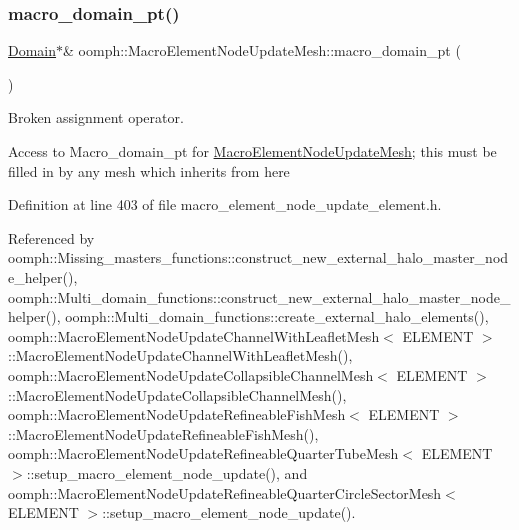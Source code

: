 \mbox{\label{classoomph_1_1MacroElementNodeUpdateMesh_af3b019d6a195493a7feb7f03832bb6fd}} 
\subsubsection{\texorpdfstring{macro\+\_\+domain\+\_\+pt()}{macro\_domain\_pt()}}
{\footnotesize\ttfamily \hyperlink{classoomph_1_1Domain}{Domain}$\ast$\& oomph\+::\+Macro\+Element\+Node\+Update\+Mesh\+::macro\+\_\+domain\+\_\+pt (\begin{DoxyParamCaption}{ }\end{DoxyParamCaption})\hspace{0.3cm}{\ttfamily [inline]}}



Broken assignment operator. 

Access to Macro\+\_\+domain\+\_\+pt for \hyperlink{classoomph_1_1MacroElementNodeUpdateMesh}{Macro\+Element\+Node\+Update\+Mesh}; this must be filled in by any mesh which inherits from here 

Definition at line 403 of file macro\+\_\+element\+\_\+node\+\_\+update\+\_\+element.\+h.



Referenced by oomph\+::\+Missing\+\_\+masters\+\_\+functions\+::construct\+\_\+new\+\_\+external\+\_\+halo\+\_\+master\+\_\+node\+\_\+helper(), oomph\+::\+Multi\+\_\+domain\+\_\+functions\+::construct\+\_\+new\+\_\+external\+\_\+halo\+\_\+master\+\_\+node\+\_\+helper(), oomph\+::\+Multi\+\_\+domain\+\_\+functions\+::create\+\_\+external\+\_\+halo\+\_\+elements(), oomph\+::\+Macro\+Element\+Node\+Update\+Channel\+With\+Leaflet\+Mesh$<$ E\+L\+E\+M\+E\+N\+T $>$\+::\+Macro\+Element\+Node\+Update\+Channel\+With\+Leaflet\+Mesh(), oomph\+::\+Macro\+Element\+Node\+Update\+Collapsible\+Channel\+Mesh$<$ E\+L\+E\+M\+E\+N\+T $>$\+::\+Macro\+Element\+Node\+Update\+Collapsible\+Channel\+Mesh(), oomph\+::\+Macro\+Element\+Node\+Update\+Refineable\+Fish\+Mesh$<$ E\+L\+E\+M\+E\+N\+T $>$\+::\+Macro\+Element\+Node\+Update\+Refineable\+Fish\+Mesh(), oomph\+::\+Macro\+Element\+Node\+Update\+Refineable\+Quarter\+Tube\+Mesh$<$ E\+L\+E\+M\+E\+N\+T $>$\+::setup\+\_\+macro\+\_\+element\+\_\+node\+\_\+update(), and oomph\+::\+Macro\+Element\+Node\+Update\+Refineable\+Quarter\+Circle\+Sector\+Mesh$<$ E\+L\+E\+M\+E\+N\+T $>$\+::setup\+\_\+macro\+\_\+element\+\_\+node\+\_\+update().

